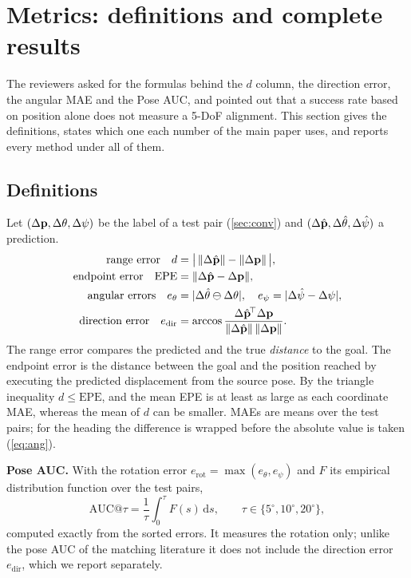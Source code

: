 \section{Metrics: definitions and complete results}
\label{sec:metrics}

The reviewers asked for the formulas behind the $d$ column, the direction error, the angular MAE and the Pose AUC, and pointed out that a success rate based on position alone does not measure a 5-DoF alignment. This section gives the definitions, states which one each number of the main paper uses, and reports every method under all of them.

\subsection{Definitions}

Let $(\Delta\mathbf{p},\Delta\theta,\Delta\psi)$ be the label of a test pair (\cref{sec:conv}) and $(\Delta\hat{\mathbf{p}},\Delta\hat\theta,\Delta\hat\psi)$ a prediction.
\begin{align}
\text{range error}\quad d&=\big|\,\|\Delta\hat{\mathbf{p}}\|-\|\Delta\mathbf{p}\|\,\big|,\label{eq:d}\\
\text{endpoint error}\quad \mathrm{EPE}&=\|\Delta\hat{\mathbf{p}}-\Delta\mathbf{p}\|,\label{eq:epe}\\
\text{angular errors}\quad e_\theta&=|\Delta\hat\theta\ominus\Delta\theta|,\quad e_\psi=|\Delta\hat\psi-\Delta\psi|,\label{eq:ang}\\
\text{direction error}\quad e_{\mathrm{dir}}&=\arccos\frac{\Delta\hat{\mathbf{p}}^{\!\top}\Delta\mathbf{p}}{\|\Delta\hat{\mathbf{p}}\|\,\|\Delta\mathbf{p}\|}.\label{eq:dir}
\end{align}
The range error compares the predicted and the true \emph{distance} to the goal. The endpoint error is the distance between the goal and the position reached by executing the predicted displacement from the source pose. By the triangle inequality $d\le\mathrm{EPE}$, and the mean EPE is at least as large as each coordinate MAE, whereas the mean of $d$ can be smaller. MAEs are means over the test pairs; for the heading the difference is wrapped before the absolute value is taken (\cref{eq:ang}).

\noindent\textbf{Pose AUC.} With the rotation error $e_{\mathrm{rot}}=\max(e_\theta,e_\psi)$ and $F$ its empirical distribution function over the test pairs,
\begin{equation}
\mathrm{AUC}@\tau=\frac{1}{\tau}\int_0^{\tau}F(s)\,\mathrm{d}s,\qquad \tau\in\{5^\circ,10^\circ,20^\circ\},
\end{equation}
computed exactly from the sorted errors. It measures the rotation only; unlike the pose AUC of the matching literature it does not include the direction error $e_{\mathrm{dir}}$, which we report separately.

